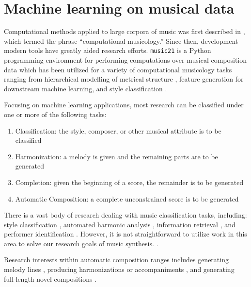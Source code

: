 \section{Machine learning on musical data}

Computational methods applied to large corpora of music was first described in
\citet{coutinho2005computational}, which termed the phrase ``computational
musicology.'' Since then, development modern tools have greatly aided research
efforts. \texttt{music21} \citep{Scott2015} is a Python programming environment
for performing computations over musical composition data which has been
utilized for a variety of computational musicology tasks ranging from
hierarchical modelling of metrical structure \citep{ariza2010modeling}, feature
generation for downstream machine learning\citep{Cuthbert2011}, and style
classification \citep{Herlands2014}.

Focusing on machine learning applications, most research can be
classified under one or more of the following tasks:
\begin{enumerate}
  \item Classification: the style, composer, or other musical attribute is to be classified
  \item Harmonization: a melody is given and the remaining parts are to be generated
  \item Completion: given the beginning of a score, the remainder is to be generated
  \item Automatic Composition: a complete unconstrained score is to be generated
\end{enumerate}

There is a vast body of research dealing with music classification tasks,
including: style classification \citep{Herlands2014,dannenberg1997machine},
automated harmonic analysis \citep{ni2012end}, information retrieval
\citep{mandel2006support}, and performer identification
\citep{stamatatos2005automatic}. However, it is not straightforward to utilize
work in this area to solve our research goals of music synthesis.
.

Research interests within automatic composition ranges includes generating
melody lines
\citep{conklin1995multiple,todd1988sequential,todd1989connectionist}, producing
harmonizations or accompaniments
\citep{ebciouglu1988expert,hild1991harmonet,tsang1991harmonizing,ames1989markov,Allan2005,chuan2007hybrid},
and generating full-length novel compositions
\citep{elman1990finding,spangler1998bach,Eck2002,scirea2016metacompose}.

